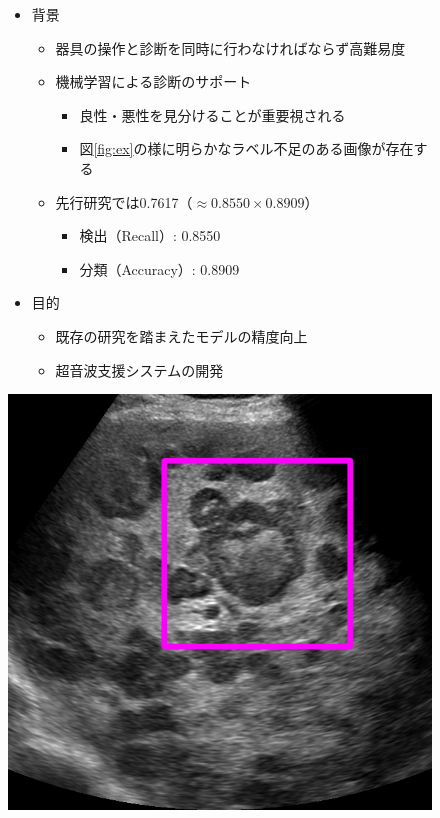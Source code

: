\documentclass[a4j]{ujarticle}
\newcommand{\Fref}[1]{\mbox{図\ref{fig:#1}}}
\begin{document}
    \begin{figure}[h]
        \begin{minipage}{.59\textwidth}
            \begin{itemize}
                \item 背景
                \begin{itemize}
                    \item 器具の操作と診断を同時に行わなければならず高難易度
                    \item 機械学習による診断のサポート
                    \begin{itemize}
                        \item 良性・悪性を見分けることが重要視される
                        \item \Fref{ex}の様に明らかなラベル不足\footnotemark[1]のある画像が存在する
                    \end{itemize}
                    \item 先行研究では0.7617（$\approx 0.8550 \times 0.8909$）
                    \begin{itemize}
                        \item 検出（Recall）: 0.8550
                        \item 分類（Accuracy）: 0.8909
                    \end{itemize}
                \end{itemize}
                \item 目的
                \begin{itemize}
                    \item 既存の研究を踏まえたモデルの精度向上
                    \item 超音波支援システムの開発
                \end{itemize}
            \end{itemize}
        \end{minipage}
        \begin{minipage}{.39\textwidth}
            \centering
            \includegraphics[width=.9\linewidth]{../fig/pseudo_a.png}

\end{minipage}
\end{figure}
\end{document}
